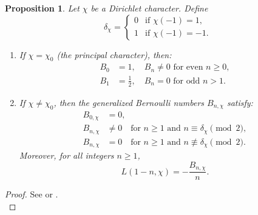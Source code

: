 \documentclass[12pt]{amsart}
\newtheorem{proposition}[theorem]{Proposition}
\begin{document}
 \begin{proposition}
 Let $\chi$ be a Dirichlet character. Define
\[
\delta_\chi =
\begin{cases}
0 & \text{if } \chi(-1) = 1, \\
1 & \text{if } \chi(-1) = -1.
\end{cases}
\]


\begin{enumerate}
    \item If $\chi = \chi_0$ (the principal character), then:
    \[
    \begin{split}
        B_0 &= 1, \quad B_n \ne 0 \text{ for even } n \geq 0, \\
        B_1 &= \frac{1}{2}, \quad B_n = 0 \text{ for odd } n > 1.
    \end{split}
    \]


    \item If $\chi \ne \chi_0$, then the generalized Bernoulli numbers $B_{n,\chi}$ satisfy:
    \[
    \begin{split}
        B_{0,\chi} &= 0, \\
        B_{n,\chi} &\ne 0 \quad \text{for } n \geq 1 \text{ and } n \equiv \delta_\chi \pmod{2}, \\
        B_{n,\chi} &= 0 \quad \text{for } n \geq 1 \text{ and } n \not\equiv \delta_\chi \pmod{2}.
    \end{split}
    \]
    Moreover, for all integers $n \geq 1$,
    \[
    L(1 - n, \chi) = -\frac{B_{n,\chi}}{n}.
    \]
\end{enumerate} 

 
 \end{proposition}
 \begin{proof}
 See \cite[Theorem 2, p. 12]{Iwasawa} or \cite[p. 268]{ApostolNumberTheory}.\\
 \end{proof}
\end{document}
